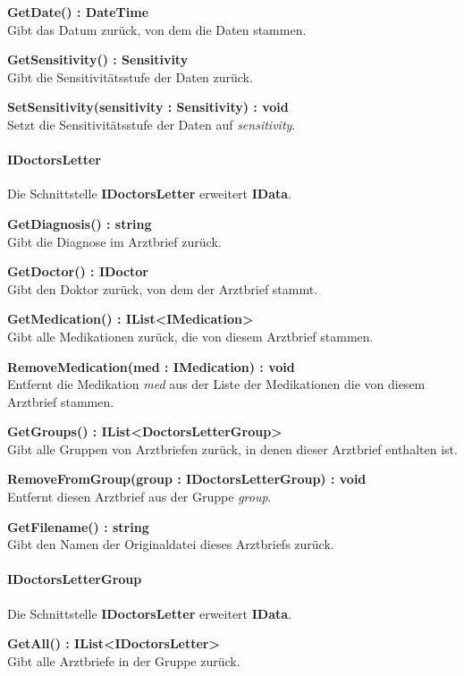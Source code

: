 \documentclass[a4paper]{scrreprt}
\begin{document}
\textbf{GetDate() : DateTime}\\
Gibt das Datum zurück, von dem die Daten stammen.

\textbf{GetSensitivity() : Sensitivity}\\
Gibt die Sensitivitätsstufe der Daten zurück.

\textbf{SetSensitivity(sensitivity : Sensitivity) : void}\\
Setzt die Sensitivitätsstufe der Daten auf \textit{sensitivity}.

\paragraph{IDoctorsLetter}
Die Schnittstelle \textbf{IDoctorsLetter} erweitert \textbf{IData}.

\textbf{GetDiagnosis() : string}\\
Gibt die Diagnose im Arztbrief zurück.

\textbf{GetDoctor() : IDoctor}\\
Gibt den Doktor zurück, von dem der Arztbrief stammt.

\textbf{GetMedication() : IList<IMedication>}\\
Gibt alle Medikationen zurück, die von diesem Arztbrief stammen.

\textbf{RemoveMedication(med : IMedication) : void}\\
Entfernt die Medikation \textit{med} aus der Liste der Medikationen die von diesem Arztbrief stammen.

\textbf{GetGroups() : IList<DoctorsLetterGroup>}\\
Gibt alle Gruppen von Arztbriefen zurück, in denen dieser Arztbrief enthalten ist.

\textbf{RemoveFromGroup(group : IDoctorsLetterGroup) : void}\\
Entfernt diesen Arztbrief aus der Gruppe \textit{group}.

\textbf{GetFilename() : string}\\
Gibt den Namen der Originaldatei dieses Arztbriefs zurück.

\paragraph{IDoctorsLetterGroup}
Die Schnittstelle \textbf{IDoctorsLetter} erweitert \textbf{IData}.

\textbf{GetAll() : IList<IDoctorsLetter>}\\
Gibt alle Arztbriefe in der Gruppe zurück.
\end{document}
